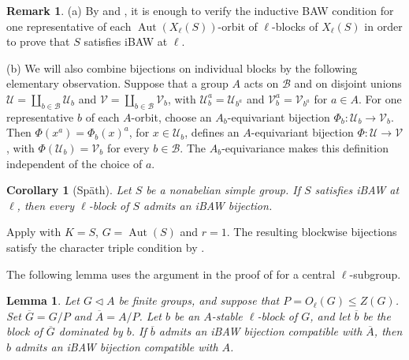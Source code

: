 \documentclass[10pt]{amsart}
\newtheorem{lemma}[theorem]{Lemma}
\newtheorem{corollary}[theorem]{Corollary}
\theoremstyle{definition}
\newtheorem{remark}[theorem]{Remark}
\renewcommand{\leq}{\leqslant}
\let\oldendproof\endproof
\renewenvironment{proof}[1][\proofname]{%
  \oldproof[\bfseries #1]%
}{\oldendproof}
\DeclareMathOperator{\Aut}{Aut}
\numberwithin{equation}{section}
\numberwithin{table}{section}
\begin{document}
\begin{remark}\label{rem:block-aggregation}
\textup{(a)} By \cite[Lemma~3.3]{KoshitaniSpath2016} and
\cite[Remark~5.18]{Spath2013}, it is enough to verify the inductive BAW
condition for one representative of each $\Aut(X_\ell(S))$-orbit of
$\ell$-blocks of $X_\ell(S)$ in order to prove that $S$ satisfies iBAW at
$\ell$.

\textup{(b)} We will also combine bijections on individual blocks by the following
elementary observation. Suppose that a group $A$ acts on $\mathcal B$ and on
disjoint unions $\mathcal U=\coprod_{b\in\mathcal B}\mathcal U_b$ and
$\mathcal V=\coprod_{b\in\mathcal B}\mathcal V_b$, with
$\mathcal U_b^a=\mathcal U_{b^a}$ and
$\mathcal V_b^a=\mathcal V_{b^a}$ for $a\in A$.
For one representative $b$ of each $A$-orbit, choose an
$A_b$-equivariant bijection $\Phi_b:\mathcal U_b\to\mathcal V_b$.
Then $\Phi(x^a)=\Phi_b(x)^a$, for $x\in\mathcal U_b$, defines an
$A$-equivariant bijection $\Phi:\mathcal U\to\mathcal V$, with
$\Phi(\mathcal U_b)=\mathcal V_b$ for every $b\in\mathcal B$.
The $A_b$-equivariance makes this definition independent of the choice of $a$.
\end{remark}

\begin{corollary}[Sp\"ath]\label{cor:fixed-point-descent}
Let $S$ be a nonabelian simple group.  If $S$ satisfies iBAW at $\ell$, then
every $\ell$-block of $S$ admits an iBAW
bijection.
\end{corollary}

\begin{proof}
Apply \cite[Proposition~4.6(a)--(c)]{Spath2013} with $K=S$,
$G=\Aut(S)$ and $r=1$. The resulting blockwise bijections satisfy
the character triple condition by
\cite[Proposition~3.6(b) and Theorem~3.5(b)]{Spath2017Triples}.
\end{proof}

The following lemma uses the argument in the proof of
\cite[Lemma~6.3]{MartinezRizoRossi2026} for a central $\ell$-subgroup.

\begin{lemma}\label{lem:type-b-normal-core}
Let $G\lhd A$ be finite groups, and suppose that
$P=O_\ell(G)\leq Z(G)$. Set $\overline G=G/P$ and
$\overline A=A/P$. Let $b$ be an $A$-stable $\ell$-block of $G$,
and let $\overline b$ be the block of $\overline G$ dominated by $b$.
If $\overline b$ admits an iBAW bijection compatible with
$\overline A$, then $b$ admits an iBAW bijection compatible with $A$.
\end{lemma}
\end{document}
